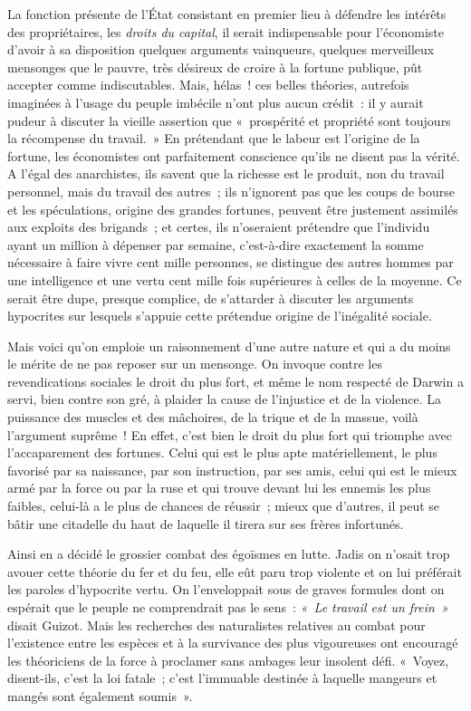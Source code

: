 \documentclass[french,twoside]{book} %
\begin{document}
La fonction présente de l’État consistant en premier lieu à défendre les intérêts des propriétaires, les \emph{droits du capital}, il serait indispensable pour l’économiste d’avoir à sa disposition  quelques arguments vainqueurs, quelques merveilleux mensonges que le pauvre, très désireux de croire à la fortune publique, pût accepter comme indiscutables. Mais, hélas ! ces belles théories, autrefois imaginées à l’usage du peuple imbécile n’ont plus aucun crédit : il y aurait pudeur à discuter la vieille assertion que « prospérité et propriété sont toujours la récompense du travail. » En prétendant que le labeur est l’origine de la fortune, les économistes ont parfaitement conscience qu’ils ne disent pas la vérité. A l’égal des anarchistes, ils savent que la richesse est le produit, non du travail personnel, mais du travail des autres ; ils n’ignorent pas que les coups de bourse et les spéculations, origine des grandes fortunes,  peuvent être justement assimilés aux exploits des brigands ; et certes, ils n’oseraient prétendre que l’individu ayant un million à dépenser par semaine, c’est-à-dire exactement la somme nécessaire à faire vivre cent mille personnes, se distingue des autres hommes par une intelligence et une vertu cent mille fois supérieures à celles de la moyenne. Ce serait être dupe, presque complice, de s’attarder à discuter les arguments hypocrites sur lesquels s’appuie cette prétendue origine de l’inégalité sociale.\par
Mais voici qu’on emploie un raisonnement d’une autre nature et qui a du moins le mérite de ne pas reposer sur un mensonge. On invoque contre les revendications sociales le droit du plus fort, et même le nom respecté de Darwin  a servi, bien contre son gré, à plaider la cause de l’injustice et de la violence. La puissance des muscles et des mâchoires, de la trique et de la massue, voilà l’argument suprême ! En effet, c’est bien le droit du plus fort qui triomphe avec l’accaparement des fortunes. Celui qui est le plus apte matériellement, le plus favorisé par sa naissance, par son instruction, par ses amis, celui qui est le mieux armé par la force ou par la ruse et qui trouve devant lui les ennemis les plus faibles, celui-là a le plus de chances de réussir ; mieux que d’autres, il peut se bâtir une citadelle du haut de laquelle il tirera sur ses frères infortunés.\par
Ainsi en a décidé le grossier combat des égoïsmes en lutte. Jadis on n’osait  trop avouer cette théorie du fer et du feu, elle eût paru trop violente et on lui préférait les paroles d’hypocrite vertu. On l’enveloppait sous de graves formules dont on espérait que le peuple ne comprendrait pas le sens : \emph{« Le travail est un frein »} disait Guizot. Mais les recherches des naturalistes relatives au combat pour l’existence entre les espèces et à la survivance des plus vigoureuses ont encouragé les théoriciens de la force à proclamer sans ambages leur insolent défi. « Voyez, disent-ils, c’est la loi fatale ; c’est l’immuable destinée à laquelle mangeurs et mangés sont également soumis ».\par
\end{document}
